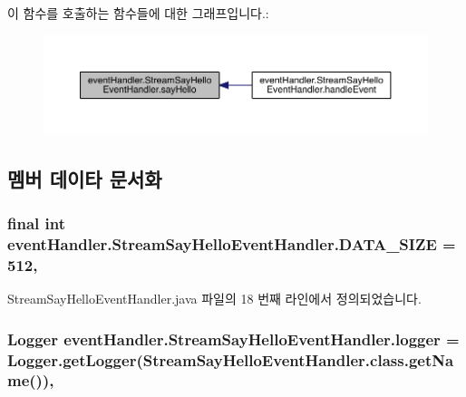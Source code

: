이 함수를 호출하는 함수들에 대한 그래프입니다.\+:\nopagebreak
\begin{figure}[H]
\begin{center}
\leavevmode
\includegraphics[width=350pt]{classevent_handler_1_1_stream_say_hello_event_handler_a6af4d6b8a6ed973d984a2eea55e405bc_icgraph}
\end{center}
\end{figure}




\subsection{멤버 데이타 문서화}
\hypertarget{classevent_handler_1_1_stream_say_hello_event_handler_a7caabf3a748346a2161f5b671eacc4b4}{
\subsubsection[{D\+A\+T\+A\+\_\+\+S\+I\+Z\+E}]{\setlength{\rightskip}{0pt plus 5cm}final int event\+Handler.\+Stream\+Say\+Hello\+Event\+Handler.\+D\+A\+T\+A\+\_\+\+S\+I\+Z\+E = 512\hspace{0.3cm}{\ttfamily [static]}, {\ttfamily [private]}}}\label{classevent_handler_1_1_stream_say_hello_event_handler_a7caabf3a748346a2161f5b671eacc4b4}


Stream\+Say\+Hello\+Event\+Handler.\+java 파일의 18 번째 라인에서 정의되었습니다.

\hypertarget{classevent_handler_1_1_stream_say_hello_event_handler_a9ce34e287f4621a4bd97e9b133e3a6f8}{
\subsubsection[{logger}]{\setlength{\rightskip}{0pt plus 5cm}Logger event\+Handler.\+Stream\+Say\+Hello\+Event\+Handler.\+logger = Logger.\+get\+Logger(Stream\+Say\+Hello\+Event\+Handler.\+class.\+get\+Name())\hspace{0.3cm}{\ttfamily [static]}, {\ttfamily [private]}}}\label{classevent_handler_1_1_stream_say_hello_event_handler_a9ce34e287f4621a4bd97e9b133e3a6f8}


